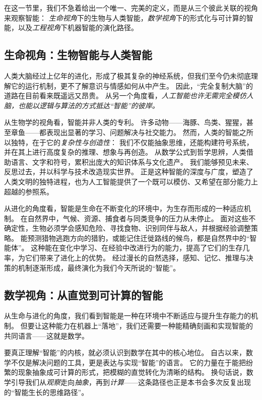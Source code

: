在这一节里，我们不急着给出一个唯一、完美的定义，而是从三个彼此关联的视角来观察智能：  
\emph{生命视角}下的生物与人类智能，\emph{数学视角}下的形式化与可计算的智能，以及\emph{工程视角}下机器智能的演化路径。

\subsection{生命视角：生物智能与人类智能}

人类大脑经过上亿年的进化，形成了极其复杂的神经系统，但我们至今仍未彻底理解它的运行机制，更不了解意识与情感如何从中产生。  
因此，“完全复制大脑”的道路在目前看来既遥远又昂贵。  
从另一个角度看，\emph{人工智能也许无需完全模仿人脑，也能以逻辑与算法的方式抵达“智能”的彼岸。}  

从生物学的视角看，智能并非人类的专利。  
许多动物——海豚、鸟类、猩猩，甚至章鱼——都表现出显著的学习、问题解决与社交能力。
然而，人类的智能之所以独特，在于它的\emph{复杂性与创造性}：  
我们不仅能抽象思维，还能构建符号系统，并在其上进行高度复杂的推理、想象与再创造。  
从数学公式到哲学思辨，人类借助语言、文字和符号，累积出庞大的知识体系与文化遗产。  
我们能够预见未来、反思过去，并以科学与技术改造现实世界。  
正是这种智能的深度与广度，塑造了人类文明的独特进程，也为人工智能提供了一个既可以模仿、又希望在部分能力上超越的参照系。  

从进化的角度看，智能是生命在不断变化的环境中，为生存而形成的一种适应机制。  
在自然界中，气候、资源、捕食者与同类竞争的压力从未停止。  
面对这些不确定性，生物必须学会感知危险、寻找食物、识别同伴与敌人，并根据经验调整策略。  
能预测猎物逃跑方向的猎豹，或能记住迁徙路线的候鸟，都是自然界中的“智能体”。  
这种能在变化中学习、在经验中改进行为的能力，提高了它们的生存几率，为它们带来了进化上的优势。  
经过漫长的自然选择，感知、记忆、推理与决策的机制逐渐形成，最终演化为我们今天所说的“智能”。  

\subsection{数学视角：从直觉到可计算的智能}

从生命与进化的角度，我们看到智能是一种在环境中不断适应与提升生存能力的机制。  
但要让这种能力在机器上“落地”，我们还需要一种能精确刻画和实现智能的共同语言——这就是数学。

要真正理解“智能”的内核，就必须认识到数学在其中的核心地位。  
自古以来，数学不仅是解决问题的工具，更是表达与实现“智能”的语言。  
它的力量在于能把纷繁的现象抽象成可计算的形式，把模糊的直觉转化为清晰的结构。  
换句话说，数学引导我们从\emph{观察}走向\emph{抽象}，再到\emph{计算}——这条路径也正是本书会多次反复出现的“智能生长的思维路径”。  

